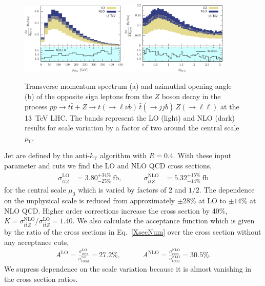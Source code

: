 \documentclass[preprint]{JHEP3} %
\def\ttb{t\bar{t}}
\newcommand{\be}{\begin{eqnarray}}
\newcommand{\ee}{\end{eqnarray}}
\begin{document}
\begin{figure}[t]
\centering %
\includegraphics[width=0.45\textwidth]{./LHC_53_Fig12.eps}
\hfill
\includegraphics[width=0.45\textwidth]{./LHC_53_Fig17.eps}
\caption{\label{fig:i} Transverse momentum spectrum (a) and azimuthal opening angle (b) of the opposite sign leptons from the $Z$ boson decay
in the process $pp \to \ttb + Z \to t(\to \ell \nu b) \, \bar{t} (\to jj \bar{b}) \, Z(\to \ell \ell)$ at the 13~TeV LHC.
The bands represent the LO (light) and NLO (dark) results for scale variation by a factor of two around the central scale $\mu_0$.
}
\end{figure}
Jet are defined by the anti-$k_\mathrm{T}$ algorithm \cite{Cacciari:2008gp} with $R=0.4$.
With these input parameter and cuts we find the LO and NLO QCD cross sections,
\be
\label{XsecNum}
  \sigma_{\ttb Z}^\mathrm{LO} &= 3.80^{+34\%}_{-25\%}~\mathrm{fb},
  \quad\quad\quad
  \sigma_{\ttb Z}^\mathrm{NLO} &= 5.32^{+15\%}_{-14\%}~\mathrm{fb}
\ee
for the central scale $\mu_0$ which is varied by factors of 2 and $1/2$.
The dependence on the unphysical scale is reduced from approximately $\pm 28\%$ at LO to $\pm 14\%$ at NLO QCD.
Higher order corrections increase the cross section by 40\%, $K= \sigma_{\ttb Z}^\mathrm{NLO} \big/  \sigma_{\ttb Z}^\mathrm{LO}=1.40$.
We also calculate the acceptance function which is given by the ratio of the cross sections in Eq.~\ref{XsecNum} over the 
cross section without any acceptance cuts, 
\be
  A^\mathrm{LO} = \frac{\sigma_{\mathrm{cuts}}^\mathrm{LO}}{\sigma_{\mathrm{total}}^\mathrm{LO}} = 27.2 \% ,
  \quad\quad\quad
  A^\mathrm{NLO} = \frac{\sigma_{\mathrm{cuts}}^\mathrm{NLO}}{\sigma_{\mathrm{total}}^\mathrm{NLO}} = 30.5 \%.
\ee
We supress dependence on the scale variation because it is almost vanishing in the cross section ratios.
\end{document}
